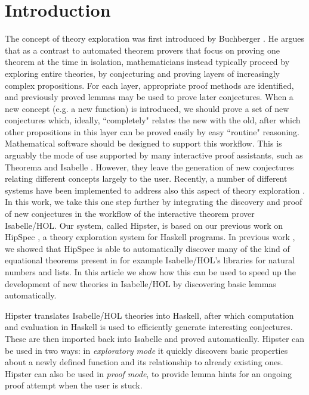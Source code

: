 \section{Introduction}
\label{sec:intro}
The concept of theory exploration was first introduced by Buchberger \cite{buchberger2000theory}. He argues that as a contrast to  automated theorem provers that focus on proving one theorem at the time in isolation, mathematicians instead typically proceed by exploring entire theories, by conjecturing and proving layers of increasingly complex propositions. For each layer, appropriate proof methods are identified, and previously proved lemmas may be used to prove later conjectures. When a new concept (e.g. a new function) is introduced, we should prove a set of new conjectures which, ideally, ``completely" relates the new with the old, after which other propositions in this layer can be proved easily by easy ``routine" reasoning. Mathematical software should be designed to support this workflow. This is arguably the mode of use supported by many interactive proof assistants, such as Theorema \cite{theorema} and Isabelle \cite{isabelle}. However, they leave the generation of new conjectures relating different concepts largely to the user. Recently, a number of different systems have been implemented to address also this aspect of theory exploration \cite{McCasland2006,isacosy,isascheme,hipspecCADE}.  In this work, we take this one step further by integrating the discovery and proof of new conjectures in the workflow of the interactive theorem prover Isabelle/HOL. Our system, called Hipster, is based on our previous work on HipSpec \cite{hipspecCADE}, a theory exploration system for Haskell programs. In previous work \cite{hipspecCADE}, we showed that HipSpec is able to automatically discover many of the kind of equational theorems present in for example Isabelle/HOL's libraries for natural numbers and lists. In this article we show how this can be used to speed up the development of new theories in Isabelle/HOL by discovering basic lemmas automatically. 

Hipster translates Isabelle/HOL theories into Haskell, after which computation and evaluation in Haskell is used to efficiently generate interesting conjectures. These are then imported back into Isabelle and proved automatically. Hipster can be used in two ways: in \emph{exploratory mode} it quickly discovers basic properties about a newly defined function and its relationship to already existing ones. Hipster can also be used in \emph{proof mode}, to provide lemma hints for an ongoing proof attempt when the user is stuck. 

